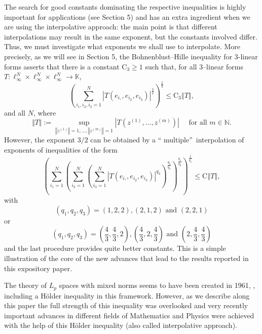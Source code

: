 \documentclass[10pt]{amsart}
\numberwithin{equation}{section}
\begin{document}
The search for good constants dominating the respective inequalities is
highly important for applications (see Section 5) and has an extra
ingredient when we are using the interpolative approach: the main point is
that different interpolations may result in the same exponent, but the
constants involved differ. Thus, we must investigate what exponents we shall
use to interpolate. More precisely, as we will see in Section 5, the
Bohnenblust--Hille inequality for $3$-linear forms asserts that there is a
constant $\mathrm{C}_{3}\geq 1$ such that, for all $3$--linear forms $T:\ell
_{\infty}^{N}\times \ell _{\infty }^{N}\times \ell _{\infty }^{N}\rightarrow
\mathbb{K}$,
\begin{equation*}
\left( \sum\limits_{i_{1},i_{2},i_{3}=1}^{N}\left\vert
T(e_{i_{^{1}}},e_{i_{2}},e_{i_{3}})\right\vert ^{\frac{3}{2}}\right) ^{\frac{2}{3}}\leq \mathrm{C}_{3}\left\Vert T\right\Vert ,
\end{equation*}
and all $N$, where
\begin{equation*}
\Vert T\Vert := \sup_{\left\Vert z^{(1)}\right\Vert=1,\dots,\left\Vert
z^{(m)}\right\Vert =1} \left\vert T\left( z^{\left(1\right) },\ldots
,z^{\left( m\right)}\right) \right\vert \quad \text{ for all } m \in \mathbb{N}.
\end{equation*}
However, the exponent $3/2$ can be obtained by a \textquotedblleft
multiple\textquotedblright\ interpolation of exponents of inequalities of
the form
\begin{equation*}
\left( \sum\limits_{i_{1}=1}^{N} \left( \sum\limits_{i_{2}=1}^{N}\left(
\sum\limits_{i_{3}=1}^{N}\left\vert
T(e_{i_{^{1}}},e_{i_{2}},e_{i_{3}})\right\vert ^{q_{3}}\right) ^{\frac{q_{2}}{q_{3}}}\right) ^{\frac{q_{1}}{q_{2}}}\right) ^{\frac{1}{q_{1}}}\leq
\mathrm{C}\left\Vert T\right\Vert ,
\end{equation*}
with
\begin{equation*}
(q_{1},q_{2},q_{3})=(1,2,2),\left( 2,1,2\right) \text{ and }\left(
2,2,1\right)
\end{equation*}
or
\begin{equation*}
(q_{1},q_{2},q_{3})= \left( \frac{4}{3},\frac{4}{3},2 \right),\left( \frac{4}{3},2,\frac{4}{3}\right) \text{ and } \left( 2,\frac{4}{3},\frac{4}{3}\right)
\end{equation*}
and the last procedure provides quite better constants. This is a simple
illustration of the core of the new advances that lead to the results
reported in this expository paper.

The theory of $L_{p}$ spaces with mixed norms seems to have been created in
1961, \cite{bene}, including a H\"{o}lder inequality in this framework.
However, as we describe along this paper the full strength of this
inequality was overlooked and very recently important advances in different
fields of Mathematics and Physics were achieved with the help of this H\"{o}lder inequality (also called interpolative approach).
\end{document}
